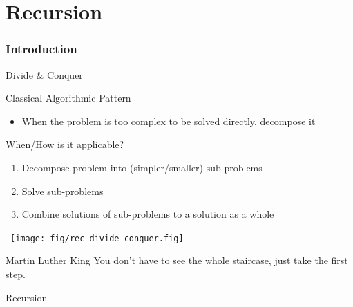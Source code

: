 \part{Recursion}
\label{recurs}\mypartpage
\begin{Coupe}
\section{Introduction}
\begin{frame}{Divide \& Conquer}
  \vspace{-.5\baselineskip}
  \begin{block}{Classical Algorithmic Pattern}
    \begin{itemize}
    \item When the problem is too complex to be solved directly, decompose it
    \end{itemize}
  \end{block}

  \begin{block}{When/How is it applicable?}
    \begin{enumerate}
    \item {} Decompose problem into (simpler/smaller)
      sub-problems
    \item {} Solve sub-problems
    \item {} Combine solutions of sub-problems
      to a solution as a whole
    \end{enumerate}
  \end{block}\medskip

  \vspace{-6.5\baselineskip}~\hfill{\texttt{[image: fig/rec\_divide\_conquer.fig]}}~~~~~

  \smallskip
  \begin{boitequote}{Martin Luther King}%
    You don't have to see the whole staircase, just take the first step.
  \end{boitequote}
  
\end{frame}

\begin{frame}{Recursion}
  \medskip


\end{frame}
\end{Coupe}
